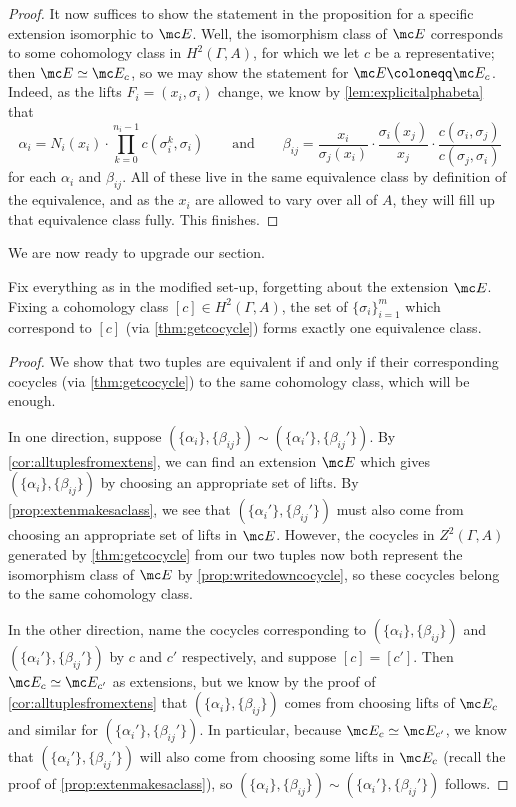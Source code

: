 \documentclass{article}
\numberwithin{equation}{section}
\begin{document}
\begin{proof}
	It now suffices to show the statement in the proposition for a specific extension isomorphic to $\mc E$. Well, the isomorphism class of $\mc E$ corresponds to some cohomology class in $H^2(\Gamma,A)$, for which we let $c$ be a representative; then $\mc E\simeq\mc E_c$, so we may show the statement for $\mc E\coloneqq\mc E_c$. Indeed, as the lifts $F_i=(x_i,\sigma_i)$ change, we know by \autoref{lem:explicitalphabeta} that
	\[\alpha_i=N_i(x_i)\cdot\prod_{k=0}^{n_i-1}c\left(\sigma_i^k,\sigma_i\right)\qquad\text{and}\qquad\beta_{ij}=\frac{x_i}{\sigma_j(x_i)}\cdot\frac{\sigma_i(x_j)}{x_j}\cdot\frac{c(\sigma_i,\sigma_j)}{c(\sigma_j,\sigma_i)}\]
	for each $\alpha_i$ and $\beta_{ij}$. All of these live in the same equivalence class by definition of the equivalence, and as the $x_i$ are allowed to vary over all of $A$, they will fill up that equivalence class fully. This finishes.
\end{proof}
We are now ready to upgrade our section.
\begin{cor} \label{cor:cohomologymakesaclass}
	Fix everything as in the modified set-up, forgetting about the extension $\mc E$. Fixing a cohomology class $[c]\in H^2(\Gamma,A)$, the set of $\{\sigma_i\}_{i=1}^m$ which correspond to $[c]$ (via \autoref{thm:getcocycle}) forms exactly one equivalence class.
\end{cor}
\begin{proof}
	We show that two tuples are equivalent if and only if their corresponding cocycles (via \autoref{thm:getcocycle}) to the same cohomology class, which will be enough.
	
	In one direction, suppose $(\{\alpha_i\},\{\beta_{ij}\})\sim(\{\alpha_i'\},\{\beta_{ij}'\})$. By \autoref{cor:alltuplesfromextens}, we can find an extension $\mc E$ which gives $(\{\alpha_i\},\{\beta_{ij}\})$ by choosing an appropriate set of lifts. By \autoref{prop:extenmakesaclass}, we see that $(\{\alpha_i'\},\{\beta_{ij}'\})$ must also come from choosing an appropriate set of lifts in $\mc E$. However, the cocycles in $Z^2(\Gamma,A)$ generated by \autoref{thm:getcocycle} from our two tuples now both represent the isomorphism class of $\mc E$ by \autoref{prop:writedowncocycle}, so these cocycles belong to the same cohomology class.

	In the other direction, name the cocycles corresponding to $(\{\alpha_i\},\{\beta_{ij}\})$ and $(\{\alpha_i'\},\{\beta_{ij}'\})$ by $c$ and $c'$ respectively, and suppose $[c]=[c']$. Then $\mc E_c\simeq\mc E_{c'}$ as extensions, but we know by the proof of \autoref{cor:alltuplesfromextens} that $(\{\alpha_i\},\{\beta_{ij}\})$ comes from choosing lifts of $\mc E_c$ and similar for $(\{\alpha_i'\},\{\beta_{ij}'\})$. In particular, because $\mc E_c\simeq\mc E_{c'}$, we know that $(\{\alpha_i'\},\{\beta_{ij}'\})$ will also come from choosing some lifts in $\mc E_c$ (recall the proof of \autoref{prop:extenmakesaclass}), so $(\{\alpha_i\},\{\beta_{ij}\})\sim(\{\alpha_i'\},\{\beta_{ij}'\})$ follows.
\end{proof}
\end{document}
